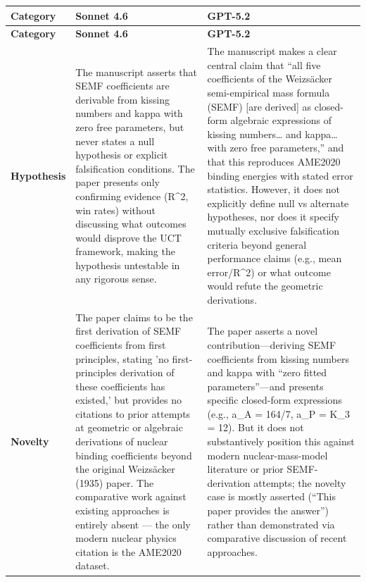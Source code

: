 \documentclass[11pt]{article}
\begin{document}
\begin{longtable}{@{} p{2.2cm} p{6.3cm} p{6.3cm} @{}}
\toprule
\textbf{Category} & \textbf{Sonnet 4.6} & \textbf{GPT-5.2} \\
\midrule
\endfirsthead
\toprule
\textbf{Category} & \textbf{Sonnet 4.6} & \textbf{GPT-5.2} \\
\midrule
\endhead
\bottomrule
\endlastfoot

\rowcolor{rowgray}
\textbf{Hypothesis} &
The manuscript asserts that SEMF coefficients are derivable from kissing numbers and kappa with zero free parameters, but never states a null hypothesis or explicit falsification conditions. The paper presents only confirming evidence (R\textasciicircum{}2, win rates) without discussing what outcomes would disprove the UCT framework, making the hypothesis untestable in any rigorous sense. &
The manuscript makes a clear central claim that “all five coefficients of the Weizsäcker semi-empirical mass formula (SEMF) [are derived] as closed-form algebraic expressions of kissing numbers… and kappa… with zero free parameters,” and that this reproduces AME2020 binding energies with stated error statistics. However, it does not explicitly define null vs alternate hypotheses, nor does it specify mutually exclusive falsification criteria beyond general performance claims (e.g., mean error/R\textasciicircum{}2) or what outcome would refute the geometric derivations. \\[6pt]

\textbf{Novelty} &
The paper claims to be the first derivation of SEMF coefficients from first principles, stating 'no first-principles derivation of these coefficients has existed,' but provides no citations to prior attempts at geometric or algebraic derivations of nuclear binding coefficients beyond the original Weizsäcker (1935) paper. The comparative work against existing approaches is entirely absent — the only modern nuclear physics citation is the AME2020 dataset. &
The paper asserts a novel contribution—deriving SEMF coefficients from kissing numbers and kappa with “zero fitted parameters”—and presents specific closed-form expressions (e.g., a\_A = 164/7, a\_P = K\_3 = 12). But it does not substantively position this against modern nuclear-mass-model literature or prior SEMF-derivation attempts; the novelty case is mostly asserted (“This paper provides the answer”) rather than demonstrated via comparative discussion of recent approaches. \\[6pt]


\end{longtable}
\end{document}
